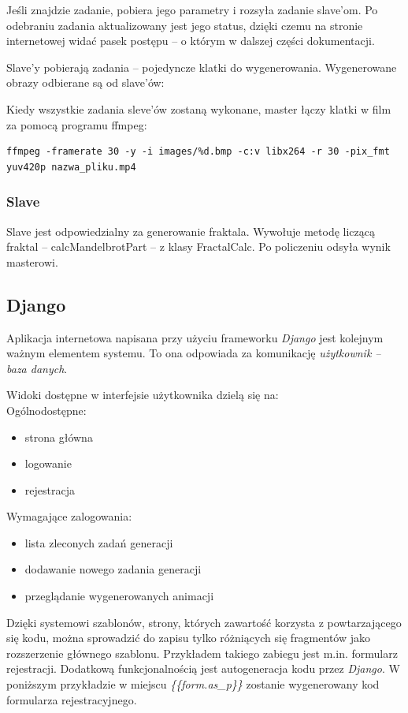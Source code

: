 \documentclass[a4paper]{article}
\begin{document}
Jeśli znajdzie zadanie, pobiera jego parametry i rozsyła zadanie slave'om. Po odebraniu zadania aktualizowany jest jego status, dzięki czemu na stronie internetowej widać pasek postępu -- o którym w dalszej części dokumentacji.

Slave'y pobierają zadania -- pojedyncze klatki do wygenerowania. Wygenerowane obrazy odbierane są od slave'ów:

Kiedy wszystkie zadania sleve'ów zostaną wykonane, master łączy klatki w film za pomocą programu ffmpeg:

\begin{lstlisting}
ffmpeg -framerate 30 -y -i images/%d.bmp -c:v libx264 -r 30 -pix_fmt yuv420p nazwa_pliku.mp4
\end{lstlisting}

\subsubsection{Slave}
Slave jest odpowiedzialny za generowanie fraktala. Wywołuje metodę liczącą fraktal -- calcMandelbrotPart -- z klasy FractalCalc. Po policzeniu odsyła wynik masterowi.

\subsection{Django}
Aplikacja internetowa napisana przy użyciu frameworku \textit{Django} jest kolejnym ważnym elementem systemu. To ona odpowiada za komunikację \textit{użytkownik -- baza danych}.

Widoki dostępne w interfejsie użytkownika dzielą się na:\\
Ogólnodostępne:
\begin{itemize}
\item strona główna
\item logowanie
\item rejestracja
\end{itemize}
Wymagające zalogowania:
\begin{itemize}
\item lista zleconych zadań generacji
\item dodawanie nowego zadania generacji
\item przeglądanie wygenerowanych animacji
\end{itemize}

Dzięki systemowi szablonów, strony, których zawartość korzysta z powtarzającego się kodu, można sprowadzić do zapisu tylko różniących się fragmentów jako rozszerzenie głównego szablonu. Przykładem takiego zabiegu jest m.in. formularz rejestracji. Dodatkową funkcjonalnością jest autogeneracja kodu przez \textit{Django}. W poniższym przykładzie w miejscu \textit{\{\{form.as\_p\}\}} zostanie wygenerowany kod formularza rejestracyjnego.
\end{document}

